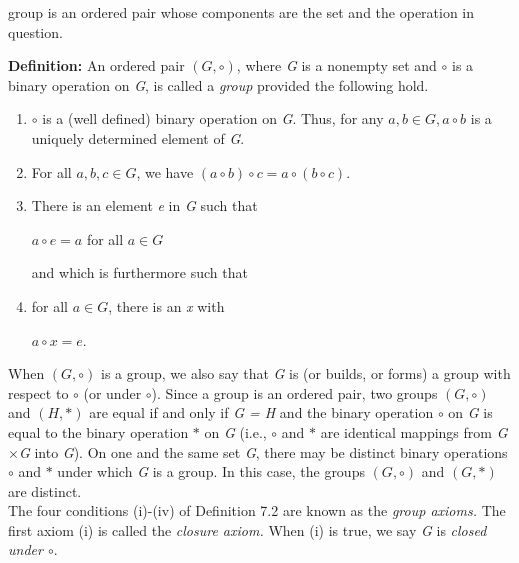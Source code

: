 \documentclass[11pt]{amsbook}
\begin{document}
	
	
	
	group is an ordered pair whose components are the set and the operation in question.
	
	\textbf{Definition:} An ordered pair $\left ( G, \circ \right )$, where \textit{G} is a nonempty set and $\circ$ is a binary operation on \textit{G}, is called a \textit{group} provided the following hold.
	
	\begin{enumerate}[label=(\roman* )]
		\item $\circ$ is a (well defined) binary operation on \textit{G}. Thus, for any $a, b \in G, a \circ b$ is a uniquely determined element of \textit{G}.
		\item For all $a, b, c\in G$, we have $(a\circ b)\circ c = a\circ (b\circ c)$.
		\item There is an element \textit{e} in \textit{G} such that 
		\begin{center}
			$a \circ e = a$ for all $a \in G$
		\end{center}
		and which is furthermore such that
		\item for all $a \in G$, there is an \textit{x}	with 
		\begin{center}
			$a \circ x = e$.
		\end{center}
	\end{enumerate}
	
	When $\left ( G, \circ \right )$ is a group, we also say that \textit{G} is (or builds, or forms) a group with respect to $\circ$ (or under $\circ$). Since a group is an ordered pair, two groups $\left ( G, \circ \right )$ and $\left ( H, \ast \right )$ are equal if and only if \textit{G = H} and the binary operation $\circ$ on \textit{G} is equal to the binary operation $\ast$ on \textit{G} (i.e., $\circ$ and $\ast$ are identical mappings from \textit{G$\times$G} into \textit{G}). On one and the same set \textit{G}, there may be distinct binary operations $\circ$ and $\ast$ under which \textit{G} is a group. In this case, the groups $\left ( G, \circ \right )$ and $\left ( G, \ast \right )$ are distinct.
	\\
	
	The four conditions (i)-(iv) of Definition 7.2 are known as the \textit{group axioms.} The first axiom (i) is called the \textit{closure axiom.} When (i) is true, we say \textit{G} is \textit{closed under $\circ$}.
	\\
	
\end{document}
